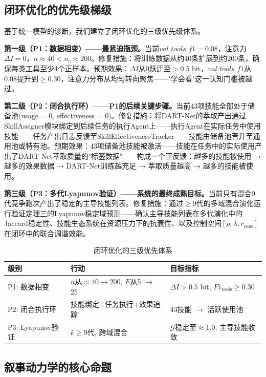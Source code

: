 \documentclass[twocolumn,10.5pt]{ctexart}
\def\cG{\mathcal{G}}
\begin{document}
\subsection{闭环优化的优先级梯级}

基于统一模型的诊断，我们建立了闭环优化的三级优先级体系。

\textbf{第一级（P1：数据相变）——最紧迫瓶颈。}当前$val\_tools\_f1 = 0.08$，注意力$\Delta I = 0$，$n \approx 40 < n_c \approx 200$。修复措施：将训练数据从约40条扩展到约200条，确保每类工具至少4个正样本。预期效果：$\Delta I$从0跃迁至$>$0.5 bit，$val\_tools\_f1$从0.08提升到$\geq$0.30，注意力分布从均匀转向聚焦——"学会看"这一认知门槛被越过。

\textbf{第二级（P2：闭合执行环）——P1的后续关键步骤。}当前43项技能全部处于储备池(usage = 0, effectiveness = 0)。修复措施：将DART-Net的萃取产出通过SkillAssigner模块绑定到后续任务的执行Agent上——执行Agent在实际任务中使用技能——任务产出日志反馈至SkillEffectivenessTracker——技能由储备池晋升至通用池或特有池。预期效果：43项储备池技能被激活——技能在任务中的实际使用产出了DART-Net萃取质量的"标签数据"——构成一个正反馈：越多的技能被使用 → 越多的效果数据 → DART-Net训练越充足 → 萃取质量越高 → 越多的技能被使用。

\textbf{第三级（P3：多代Lyapunov验证）——系统的最终成熟目标。}当前只有混合9代竞争跑次产出了稳定的主导技能列表。修复措施：通过$\geq 9$代的多域混合演化运行验证定理三的Lyapunov稳定域预测——确认主导技能列表在多代演化中的Jaccard稳定性、技能生态系统在资源压力下的抗衰性、以及控制空间$[\rho, \lambda, r_{\text{cons}}]$在闭环中的联合调谐效能。

\begin{table}[t]
\centering
\caption{闭环优化的三级优先体系}
\label{tab:priority}
\setlength{\tabcolsep}{2pt}
\renewcommand{\arraystretch}{1.15}
\begin{tabular}{lll}
\toprule
级别 & 行动 & 目标指标 \\
\midrule
P1: 数据相变 & $n$从$\approx 40 \to 200$, $E$从5 $\to$ 25 & $\Delta I > 0.5$ bit, $F1_{\text{tools}} \geq 0.30$ \\
P2: 闭合执行环 & 技能绑定+任务执行+效果追踪 & 43技能 $\to$ 活跃使用池 \\
P3: Lyapunov验证 & $k \geq 9$代, 跨域混合 & $\cG$稳定至$\approx 1.0$, 主导技能收敛 \\
\bottomrule
\end{tabular}
\end{table}

\subsection{叙事动力学的核心命题}
\end{document}
